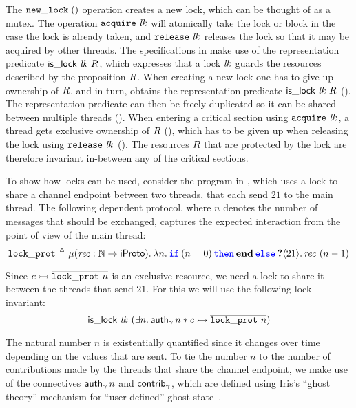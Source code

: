 The $\mathtt{new\_lock}\;()$ operation creates a new lock, which can be thought of as a mutex.
The operation $\mathtt{acquire}\ \mathit{lk}$ will atomically take the lock or block in
the case the lock is already taken,
and $\mathtt{release}\ \mathit{lk}$ releases the lock so that it may be acquired by other
threads.
The specifications in  make use of the representation
predicate $\mathsf{is\_lock}\ \mathit{lk}\ R$, which expresses that a lock $\mathit{lk}$ guards
the resources described by the proposition $R$.
When creating a new lock one has to give up ownership of $R$, and in turn,
obtains the representation predicate $\mathsf{is\_lock}\ \mathit{lk}\ R$ ().
The representation predicate can then be freely duplicated so it
can be shared between multiple threads ().
When entering a critical section using $\mathtt{acquire}\ \mathit{lk}$, a thread gets exclusive
ownership of $R$ (), which has to be given up
when releasing the lock using $\mathtt{release}\ \mathit{lk}$ ().
The resources $R$ that are protected by the lock are therefore invariant
in-between any of the critical sections.

To show how locks can be used, consider the program in
, which uses a lock to share a channel endpoint
between two threads, that each send $21$ to the main thread.
The following dependent protocol, where $n$ denotes the number of messages that
should be exchanged, captures the expected interaction from the point of view of the
main thread:
\[
\lockprotname \eqdef \MU (\recvar : \nat \rightarrow \iProto). \Lam n.
 \If (n=0) then \protend \Else \recvprotT{}{21}{\recvar\ (n-1)}
\]

\noindent
Since $\interp \chan {\dual {\lockprotname\ n}}$ is an exclusive resource, we
need a lock to share it between the threads that send $21$.
For this we will use the following lock invariant:
\[
\islock \lockvar {(\Exists n.
   \serverpredT \gname n * \interp \chan {\dual {\lockprotname\ n}})}
\]

\noindent
The natural number $n$ is existentially quantified since it changes
over time depending on the values that are sent.
To tie the number $n$ to the number of contributions made by the  threads that
share the channel endpoint, we make use of the connectives
$\mathsf{auth}_{\gamma}\ \! n$ and $\mathsf{contrib}_{\gamma}$, which are defined using
Iris's ``ghost theory'' mechanism for ``user-defined'' ghost
state~\cite{jung-POPL2015,jung-JFP2018}.

\authfig

